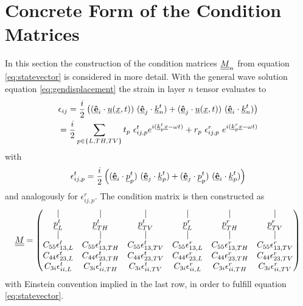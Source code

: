 \section{Concrete Form of the Condition Matrices}
In this section the construction of the condition matrices $\underline{\underline{M}}_n$ from
equation \ref{eq:statevector} is considered in more detail.
With the general wave solution equation \ref{eq:gendisplacement} the strain
in layer $n$ tensor evaluates to
\begin{align}
    \epsilon_{ij} = \frac{i}{2} \left(
    (\underline{\vu{e}}_i\cdot \underline{u}(\underline{x}, t))\
    (\underline{\vu{e}}_j\cdot \underline{k}^t_{n})
    + (\underline{\vu{e}}_j\cdot  \underline{u}(\underline{x}, t))\
    (\underline{\vu{e}}_i\cdot \underline{k}^t_{n}) \right) \\ 
    = \frac{i}{2}\sum\limits_{p\in\{L,TH,TV\}} 
    t_p\ \epsilon^t_{ij,p} e^{i(\underline{k}_{p}^t\underline{x} - \omega t)} 
    + r_p\ \epsilon^r_{ij,p}\ e^{i(\underline{k}_{p}^r\underline{x} - \omega t)} \nonumber
\end{align}
with 
\begin{equation}
    \epsilon^t_{ij,p} = \frac{i}{2} \left(
    (\underline{\vu{e}}_i\cdot \underline{p}_p^t) \
    (\underline{\vu{e}}_j\cdot \underline{k}^t_{p})
    + (\underline{\vu{e}}_j\cdot \underline{p}_p^t)\
    (\underline{\vu{e}}_i\cdot \underline{k}^t_{p}) \right)
\end{equation}
and analogously for $\epsilon^r_{ij,p}$. The condition matrix is then constructed
as 
\begin{equation}
    \underline{\underline{M}}=\begin{pmatrix}
        |  &  | &  | &  | &  |  &  | \\
    \underline{p}_L^t &  \underline{p}_{TH}^t &  \underline{p}_{TV}^t &
    \underline{p}_L^r &  \underline{p}_{TH}^r &  \underline{p}_{TV}^r  \\
        |  &  | &  | &  | &  |  &  | \\
        C_{55}\epsilon^t_{13,L} & C_{55}\epsilon^t_{13,TH} & 
        C_{55}\epsilon^t_{13,TV} & 
        C_{55}\epsilon^r_{13,L} & C_{55}\epsilon^r_{13,TH} & 
        C_{55}\epsilon^r_{13,TV} \\
        C_{44}\epsilon^t_{23,L} & C_{44}\epsilon^t_{23,TH} & 
        C_{44}\epsilon^t_{23,TV} &
        C_{44}\epsilon^r_{23,L} & C_{44}\epsilon^r_{23,TH} & 
        C_{44}\epsilon^r_{23,TV} \\
        C_{3i}\epsilon^t_{ii,L} & C_{3i}\epsilon^t_{ii,TH} & 
        C_{3i}\epsilon^t_{ii,TV} &
        C_{3i}\epsilon^r_{ii,L} & C_{3i}\epsilon^r_{ii,TH} & 
        C_{3i}\epsilon^r_{ii,TV} \\
    \end{pmatrix}
\end{equation}
with Einstein convention implied in the last row, in order to fulfill equation
\ref{eq:statevector}.


